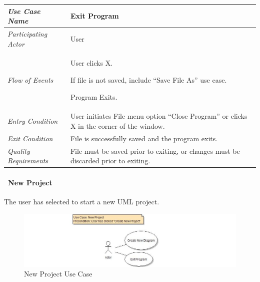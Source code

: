 \documentclass[twoside,letterpaper]{article}
\newenvironment{my_enumerate}{
\begin{enumerate}
  \setlength{\itemsep}{1pt}
  \setlength{\parskip}{0pt}
  \setlength{\parsep}{0pt}}{\end{enumerate}
}
\begin{document}
\begin{flushleft}
\tablehead{}
\begin{tabular}{|m{2.0in} m{5.0in}|}
\hline
{\bfseries\emph{Use Case Name}}
& {\bfseries Exit Program}
\\\hline
\emph{Participating Actor}
& User
\\\hline
\emph{Flow of Events}
& \begin{my_enumerate}
\item User clicks X.
\item If file is not saved, include ``Save File As'' use case.
\item Program Exits.
\end{my_enumerate}
\\\hline
\emph{Entry Condition}
&
User initiates File menu option ``Close Program'' or clicks X in the corner of the window.
\\\hline
\emph{Exit Condition}
& File is successfully saved and the program exits.
\\\hline
\emph{Quality Requirements}
& File must be saved prior to exiting, or changes must be discarded prior to exiting.
\\\hline
\end{tabular}
\end{flushleft}
\bigskip

\clearpage

\paragraph[\ Use Category]
{\ New Project} 
{The user has selected to start a new UML project.}

\begin{figure}[h]
\centering
\includegraphics[width=6.0in]{ucaseNewProj.jpg}
\caption{New Project Use Case}
\end{figure}
\end{document}

